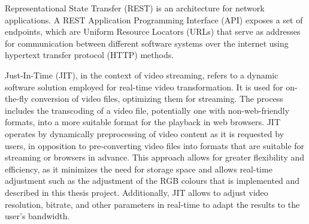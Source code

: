 \documentclass[../MasterThesis.tex]{subfiles}
\begin{document}







Representational State Transfer (REST) is an architecture for network applications. A REST Application Programming Interface (API) exposes a set of endpoints, which are Uniform Resource Locators (URLs) that serve as addresses for communication between different software systems over the internet using hypertext transfer protocol (HTTP) methods.~\cite{IEEE_Rest, webservice, Nodejs_Rest}



	
Just-In-Time (JIT), in the context of video streaming, refers to a dynamic software solution employed for real-time video transformation. 
It is used for on-the-fly conversion of video files, optimizing them for streaming. The process includes the transcoding of a video file, potentially one with non-web-friendly formats, into a more suitable format for the playback in web browsers.
JIT operates by dynamically preprocessing of video content as it is requested by users, in opposition to pre-converting video files into formats that are suitable for streaming or browsers in advance. 
This approach allows for greater flexibility and efficiency, as it minimizes the need for storage space and allows real-time adjustment such as the adjustment of the RGB colours that is implemented and described in this thesis project.
Additionally, JIT allows to adjust video resolution, bitrate, and other parameters in real-time to adapt the results to the user's bandwidth.~\cite{JIT_IEEE}
\end{document}
